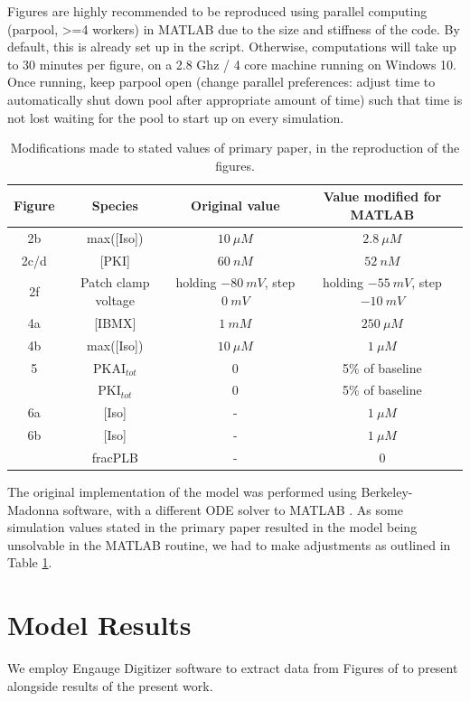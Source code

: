 \documentclass[fleqn,10pt]{physiome}
\begin{document}
Figures are highly recommended to be reproduced using parallel computing (parpool, >=4 workers) in MATLAB due to the size and stiffness of the code. By default, this is already set up in the script. Otherwise, computations will take up to 30 minutes per figure, on a 2.8 Ghz / 4 core machine running on Windows 10.
Once running, keep parpool open (change parallel preferences: adjust time to automatically shut down pool after appropriate amount of time) such that time is not lost waiting for the pool to start up on every simulation.

\begin{table}[]
    \centering
    \begin{tabular}{|c|c|c|c|}
    \hline
         Figure & Species & Original value & Value modified for MATLAB \\
         \hline
         2b & max([Iso]) & $10\ \mu M$ & $2.8\ \mu M$ \\
         2c/d & [PKI] & $60\ nM$ & $52\ nM$ \\
         2f & Patch clamp voltage & holding $-80\ mV$, step $0\ mV$ & holding $-55\ mV$, step $-10\ mV$\\
         4a & [IBMX] & $1\ mM$ & $250\ \mu M$\\
         4b & max([Iso]) & $10\ \mu M$ & $1\ \mu M$ \\
         5 & PKAI$_{tot}$& 0 & 5\% of baseline\\
           & PKI$_{tot}$& 0 & 5\% of baseline\\
         6a & [Iso] & - & $1\ \mu M$ \\
         6b & [Iso] & - & $1\ \mu M$ \\
            & fracPLB & - & 0 \\
        \hline
    \end{tabular}
    \caption{Modifications made to stated values of primary paper, in the reproduction of the figures.}
    \label{tab:parameterAdjustments}
\end{table}
The original implementation of the model was performed using Berkeley-Madonna software, with a different ODE solver to MATLAB \cite{saucerman2003}. As some simulation values stated in the primary paper resulted in the model being unsolvable in the MATLAB routine, we had to make adjustments as outlined in Table \ref{tab:parameterAdjustments}.

\section{Model Results}
We employ Engauge Digitizer software \citep{mark_mitchell_2020_3941227} to extract data from Figures of \cite{saucerman2003} to present alongside results of the present work.
\end{document}
